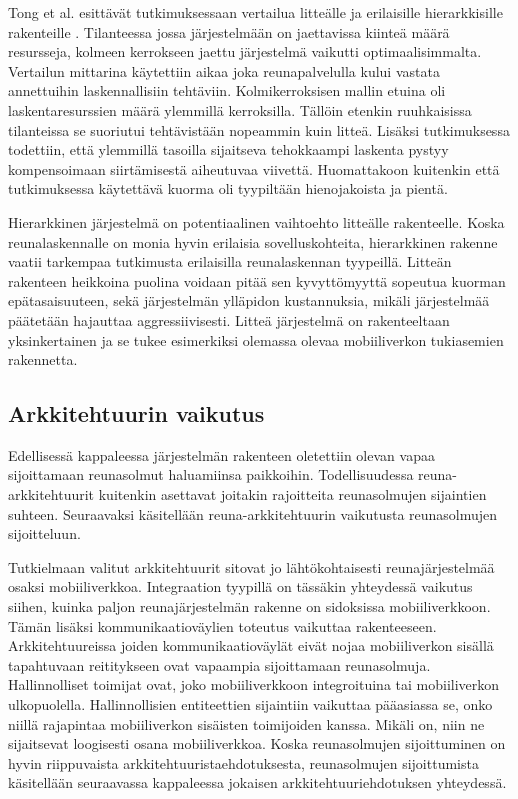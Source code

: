 Tong et al. esittävät tutkimuksessaan vertailua litteälle ja erilaisille hierarkkisille rakenteille \cite{tong2016hierarchical}. Tilanteessa jossa järjestelmään on jaettavissa kiinteä määrä resursseja, kolmeen kerrokseen jaettu järjestelmä vaikutti optimaalisimmalta.
Vertailun mittarina käytettiin aikaa joka reunapalvelulla kului vastata annettuihin laskennallisiin tehtäviin. Kolmikerroksisen mallin etuina oli laskentaresurssien määrä ylemmillä kerroksilla. Tällöin etenkin ruuhkaisissa tilanteissa se suoriutui tehtävistään nopeammin kuin litteä. Lisäksi tutkimuksessa todettiin, että ylemmillä tasoilla sijaitseva tehokkaampi laskenta pystyy kompensoimaan siirtämisestä aiheutuvaa viivettä. Huomattakoon kuitenkin että tutkimuksessa käytettävä kuorma oli tyypiltään hienojakoista ja pientä. 


Hierarkkinen järjestelmä on potentiaalinen vaihtoehto litteälle rakenteelle. Koska reunalaskennalle on monia hyvin erilaisia sovelluskohteita, hierarkkinen rakenne vaatii tarkempaa tutkimusta erilaisilla reunalaskennan tyypeillä. Litteän rakenteen heikkoina puolina voidaan pitää sen kyvyttömyyttä sopeutua kuorman epätasaisuuteen, sekä järjestelmän ylläpidon kustannuksia, mikäli järjestelmää päätetään hajauttaa aggressiivisesti. Litteä järjestelmä on rakenteeltaan yksinkertainen ja se tukee esimerkiksi olemassa olevaa mobiiliverkon tukiasemien rakennetta. 


\subsection{Arkkitehtuurin vaikutus}
Edellisessä kappaleessa järjestelmän rakenteen oletettiin olevan vapaa sijoittamaan reunasolmut haluamiinsa paikkoihin. 
Todellisuudessa reuna-arkkitehtuurit kuitenkin asettavat joitakin rajoitteita reunasolmujen sijaintien suhteen. Seuraavaksi käsitellään reuna-arkkitehtuurin vaikutusta reunasolmujen sijoitteluun.

Tutkielmaan valitut arkkitehtuurit sitovat jo lähtökohtaisesti reunajärjestelmää osaksi mobiiliverkkoa. Integraation tyypillä on tässäkin yhteydessä vaikutus siihen, kuinka paljon reunajärjestelmän rakenne on sidoksissa mobiiliverkkoon.
Tämän lisäksi kommunikaatioväylien toteutus vaikuttaa rakenteeseen. 
Arkkitehtuureissa joiden kommunikaatioväylät eivät nojaa mobiiliverkon sisällä tapahtuvaan reititykseen ovat vapaampia sijoittamaan reunasolmuja. 
Hallinnolliset toimijat ovat, joko mobiiliverkkoon integroituina tai mobiiliverkon ulkopuolella. Hallinnollisien entiteettien sijaintiin vaikuttaa pääasiassa se, onko niillä rajapintaa mobiiliverkon sisäisten toimijoiden kanssa. Mikäli on, niin ne sijaitsevat loogisesti osana mobiiliverkkoa. 
Koska reunasolmujen sijoittuminen on hyvin riippuvaista arkkitehtuuristaehdotuksesta, reunasolmujen sijoittumista käsitellään seuraavassa kappaleessa jokaisen arkkitehtuuriehdotuksen yhteydessä.


